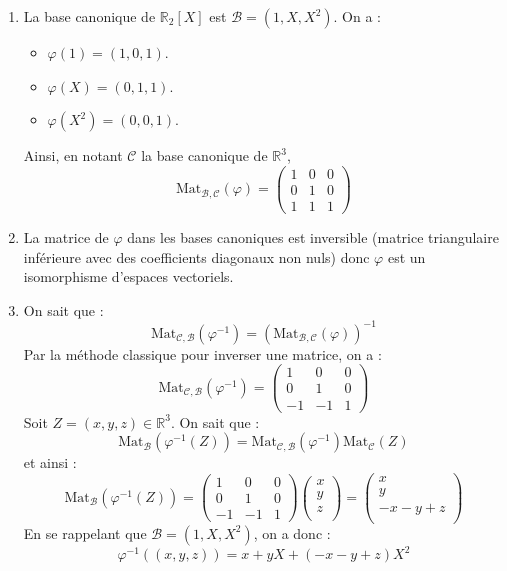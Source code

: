 \documentclass[a4paper,twoside,french,11pt]{VcCours}
\begin{document}
\begin{enumerate}
\item La base canonique de $\mathbb{R}_2[X]$ est $\mathcal{B}=(1,X,X^2)$. On a :
\begin{itemize}
\item $\varphi(1) = (1,0,1)$.
\item $\varphi(X) = (0, 1, 1)$. 
\item $\varphi(X^2) = (0, 0, 1)$.
\end{itemize}
Ainsi, en notant $\mathcal{C}$ la base canonique de $\mathbb{R}^3$,
$$ \textrm{Mat}_{\mathcal{B}, \mathcal{C}}(\varphi) = \begin{pmatrix}
1 & 0 & 0 \\
0 & 1 & 0 \\
1 & 1 & 1 
\end{pmatrix}$$
\item La matrice de $\varphi$ dans les bases canoniques est inversible (matrice triangulaire inférieure avec des coefficients diagonaux non nuls) donc $\varphi$ est un isomorphisme d'espaces vectoriels. 

\item On sait que :
$$ \textrm{Mat}_{\mathcal{C}, \mathcal{B}}(\varphi^{-1}) = (\textrm{Mat}_{\mathcal{B}, \mathcal{C}}(\varphi))^{-1}$$
Par la méthode classique pour inverser une matrice, on a :
$$\textrm{Mat}_{\mathcal{C}, \mathcal{B}}(\varphi^{-1}) = \begin{pmatrix}
1 & 0 & 0 \\
0 & 1 & 0 \\
-1 & -1 & 1 
\end{pmatrix}$$
Soit $Z=(x,y,z) \in \mathbb{R}^3$. On sait que :
$$ \textrm{Mat}_{\mathcal{B}}(\varphi^{-1}(Z)) = \textrm{Mat}_{\mathcal{C}, \mathcal{B}}(\varphi^{-1}) \textrm{Mat}_{\mathcal{C}}(Z)$$
et ainsi :
$$ \textrm{Mat}_{\mathcal{B}}(\varphi^{-1}(Z)) = \begin{pmatrix}
1 & 0 & 0 \\
0 & 1 & 0 \\
-1 & -1 & 1 
\end{pmatrix} \begin{pmatrix}
x \\
y \\
z \\
\end{pmatrix} = \begin{pmatrix}
x \\
y \\
-x-y+z \\
\end{pmatrix}$$
En se rappelant que $\mathcal{B}=(1,X,X^2)$, on a donc :
$$ \varphi^{-1}((x,y,z)) = x + y X + (-x-y+z)X^2$$
\end{enumerate}
\end{document}
